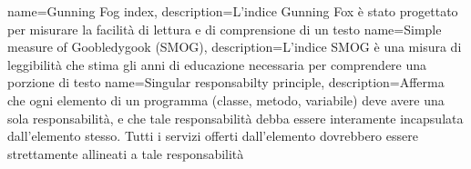 {
    name=Gunning Fog index,
    description={L'indice Gunning Fox è stato progettato per misurare la facilità di lettura e di comprensione di un testo}
}
{
    name=Simple measure of Goobledygook (SMOG),
    description={L'indice SMOG è una misura di leggibilità che stima gli anni di educazione necessaria per comprendere una porzione di testo}
}
{
    name=Singular responsabilty principle,
    description={Afferma che ogni elemento di un programma (classe, metodo, variabile) deve avere una sola responsabilità, e che tale responsabilità debba essere interamente incapsulata dall'elemento stesso. Tutti i servizi offerti dall'elemento dovrebbero essere strettamente allineati a tale responsabilità}
}



